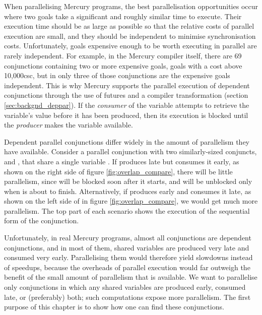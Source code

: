 When parallelising Mercury programs,
the best parallelisation opportunities occur
where two goals take a significant and roughly similar time to execute.
Their execution time should be as large as possible
so that the relative costs of parallel execution are small,
and they should be independent to minimise synchronisation costs.
Unfortunately, goals expensive enough to be worth executing in parallel
are rarely independent.
For example, in the Mercury compiler itself,
there are 69 conjunctions containing two or more expensive goals,
goals with a cost above 10,000csc,
but in only three of those conjunctions are the expensive goals independent.
This is why Mercury supports the parallel execution of dependent conjunctions
through the use of futures and a compiler transformation
\citep{wang:2006:hons, wang:2011:dep-par} (section \ref{sec:backgnd_deppar}).
If the \emph{consumer} of the variable attempts to retrieve the variable's value
before it has been produced, then its execution is blocked
until the \emph{producer} makes the variable available.


Dependent parallel conjunctions differ widely
in the amount of parallelism they have available.
Consider a parallel conjunction with two similarly-sized conjuncts,
 and , that share a single variable .
If  produces  late but  consumes it early,
as shown on the right side of figure \ref{fig:overlap_compare},
there will be little parallelism,
since  will be blocked soon after it starts,
and will be unblocked only when  is about to finish.
Alternatively, if  produces  early
and  consumes it late,
as shown on the left side of in figure \ref{fig:overlap_compare},
we would get much more parallelism.
The top part of each scenario
shows the execution of the sequential form of the conjunction.

Unfortunately, in real Mercury programs,
almost all conjunctions are dependent conjunctions,
and in most of them,
shared variables are produced very late and consumed very early.
Parallelising them would therefore yield slowdowns instead of speedups,
because the overheads of parallel execution would far outweigh the
benefit of the small amount of parallelism that is available.
We want to parallelise only conjunctions
in which any shared variables are produced early, consumed late,
or (preferably) both;
such computations expose more parallelism.
The first purpose of this chapter is to show how one can find these conjunctions.

